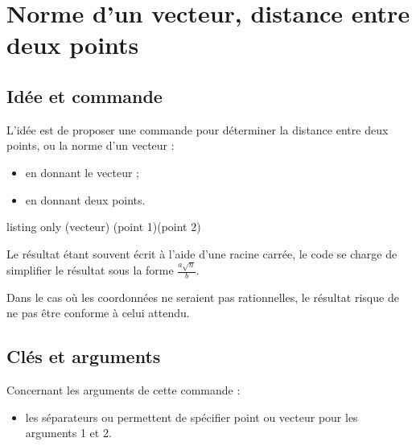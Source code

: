 \newpage

\section{Norme d'un vecteur, distance entre deux points}\label{normevect}

\subsection{Idée et commande}

\begin{tipblock}
 L'idée est de proposer une commande pour déterminer la distance entre deux points, ou la norme d'un vecteur :

\begin{itemize}
	\item en donnant le vecteur ;
	\item en donnant deux points.
\end{itemize}
\vspace*{-\baselineskip}\leavevmode
\end{tipblock}

\begin{PresCodeTexPL}{listing only}
\TrouveNorme(vecteur)
\TrouveNorme(point 1)(point 2)
\end{PresCodeTexPL}

\begin{noteblock}
Le résultat étant souvent écrit à l'aide d'une racine carrée, le code se charge de simplifier le résultat sous la forme $\frac{a\sqrt{n}}{b}$.

Dans le cas où les coordonnées ne seraient pas rationnelles, le résultat risque de ne pas être conforme à celui attendu.
\end{noteblock}

\subsection{Clés et arguments}

\begin{cautionblock}
Concernant les arguments de cette commande :

\begin{itemize}
	\item les séparateurs \ctex{,} ou \ctex{;} permettent de spécifier point ou vecteur pour les arguments 1 et 2.
\end{itemize}
\vspace*{-\baselineskip}\leavevmode
\end{cautionblock}

